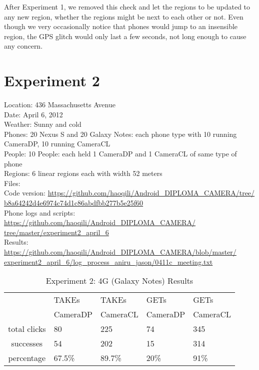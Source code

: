 After Experiment 1, we removed this check and let the regions to be updated to any new region, whether the regions might be next to each other or not. Even though we very occasionally notice that phones would jump to an insensible region, the GPS glitch would only last a few seconds, not long enough to cause any concern.

\section{Experiment 2}

Location: 436 Massachusetts Avenue\\
Date: April 6, 2012\\
Weather: Sunny and cold\\
Phones: 20 Nexus S and 20 Galaxy Notes: each phone type with 10 running CameraDP, 10 running CameraCL\\
People: 10 People: each held 1 CameraDP and 1 CameraCL of same type of phone\\
Regions: 6 linear regions each with width 52 meters\\
Files:\\
Code version: {\url{https://github.com/haoqili/Android_DIPLOMA_CAMERA/tree/}}\\
{\url{b8a64242d4e6974c74d1c86abdfbb277b5e25f60}}\\
Phone logs and scripts: {\url{https://github.com/haoqili/Android_DIPLOMA_CAMERA/}}\\
{\url{tree/master/experiment2_april_6}}\\ 
Results: {\url{https://github.com/haoqili/Android_DIPLOMA_CAMERA/blob/master/}}\\
{\url{experiment2_april_6/log_process_aniru_jason/0411c_meeting.txt}}\\

\begin{table}[htb]
\begin{scriptsize} 
\caption{Experiment 2: 4G (Galaxy Notes) Results} 
\label{table:exp-2-4g-results}
 \begin{center}
 \begin{tabular}{| c | p{1.5cm} | p{1.5cm} | p{1.5cm} | p{1.4cm} |}
  \hline
  & TAKEs & TAKEs & GETs & GETs \\
  & CameraDP & CameraCL & CameraDP & CameraCL \\
  \hline
  total clicks & 80 & 225 & 74 & 345 \\
  \hline
  successes & 54 & 202 & 15 & 314 \\
  \hline
  percentage & 67.5\% & 89.7\% & 20\% & 91\% \\
  \hline
  \end{tabular}
  \end{center}
\end{scriptsize}
\end{table}

